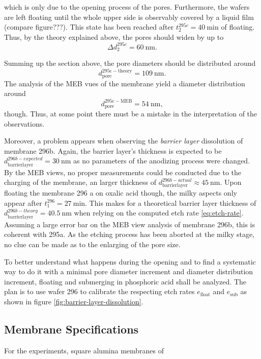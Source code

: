 \documentclass[../thesis.tex]{subfiles}
\begin{document}
                which is only due to the opening process of the pores. Furthermore, the wafers are left floating until the whole upper side is observably covered by a liquid film (compare figure???). This state has been reached after $t_\mathrm{2}^{295c}=\SI{40}{\minute} $ of floating. Thus, by the theory explained above, the pores should widen by up to
                \begin{equation}
                    \Delta d_2^{295c} =\SI{60}{\nano\meter}.
                \end{equation}
                \medskip

                Summing up the section above, the pore diameters should be distributed around
                \begin{equation}
                    d_\mathrm{pore}^\mathrm{295c-theory} = \SI{109}{\nano\meter}.
                \end{equation}
                The analysis of the MEB vues of the membrane yield a diameter distribution around
                \begin{equation}
                    d_\mathrm{pore}^\mathrm{295c-MEB} = \SI{54}{\nano\meter},
                \end{equation}
                though. Thus, at some point there must be a mistake in the interpretation of the observations.
                \medskip

                Moreover, a problem appears when observing the \textit{barrier layer} dissolution of membrane 296b. Again, the barrier layer's thickness is expected to be $d_\mathrm{barrierlayer}^{296b-expected}=\SI{30}{\nano\meter}$ as no parameters of the anodizing process were changed. By the MEB views, no proper measurements could be conducted due to the charging of the membrane, an larger thickness of $d_\mathrm{barrierlayer}^{296b-actual}\approx\SI{45}{\nano\meter}$. Upon floating the membrane 296 a on oxalic acid though, the milky aspects only appear after $t_1^{296}=\SI{27}{\minute}$. This makes for a theoretical barrier layer thickness of $d_\mathrm{barrierlayer}^{296b-theory}=\SI{40,5}{\nano\meter}$ when relying on the computed etch rate \cref{eq:etch-rate}. Assuming a large error bar on the MEB view analysis of membrane 296b, this is coherent with 295a. As the etching process has been aborted at the milky stage, no clue can be made as to the enlarging of the pore size.
                \medskip

                To better understand what happens during the opening and to find a systematic way to do it with a minimal pore diameter increment and diameter distribution increment, floating and submerging in phosphoric acid shall be analyzed. The plan is to use wafer 296 to calibrate the respecting etch rates $e_\mathrm{float}$ and $e_\mathrm{sub}$ as shown in figure \cref{fig:barrier-layer-dissolution}.
                \medskip

            


        \subsection{Membrane Specifications}

            For the experiments, square alumina membranes of
\end{document}
